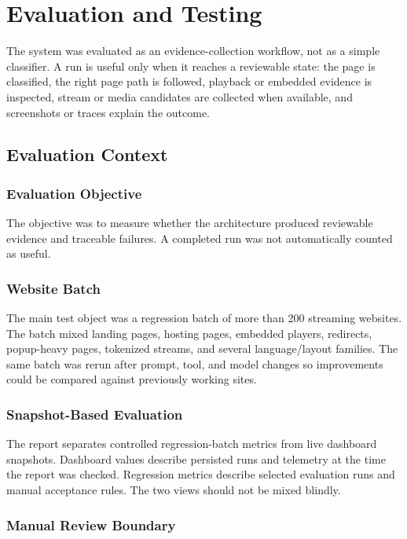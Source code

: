 \chapter{Evaluation and Testing}

The system was evaluated as an evidence-collection workflow, not as a simple
classifier. A run is useful only when it reaches a reviewable state: the page
is classified, the right page path is followed, playback or embedded evidence
is inspected, stream or media candidates are collected when available, and
screenshots or traces explain the outcome.

\section{Evaluation Context}

\subsection{Evaluation Objective}

The objective was to measure whether the architecture produced reviewable
evidence and traceable failures. A completed run was not automatically counted
as useful.

\subsection{Website Batch}

The main test object was a regression batch of more than 200 streaming
websites. The batch mixed landing pages, hosting pages, embedded players,
redirects, popup-heavy pages, tokenized streams, and several language/layout
families. The same batch was rerun after prompt, tool, and model changes so
improvements could be compared against previously working sites.

\subsection{Snapshot-Based Evaluation}

The report separates controlled regression-batch metrics from live dashboard
snapshots. Dashboard values describe persisted runs and telemetry at the time
the report was checked. Regression metrics describe selected evaluation runs
and manual acceptance rules. The two views should not be mixed blindly.

\subsection{Manual Review Boundary}

